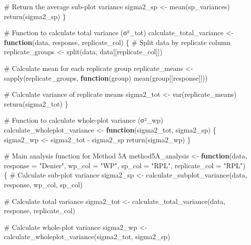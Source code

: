 \documentclass[
  letterpaper,
  DIV=11,
  numbers=noendperiod]{scrartcl}
\newenvironment{Shaded}{\begin{snugshade}}{\end{snugshade}}
\newcommand{\AttributeTok}[1]{\textcolor[rgb]{0.40,0.45,0.13}{#1}}
\newcommand{\CommentTok}[1]{\textcolor[rgb]{0.37,0.37,0.37}{#1}}
\newcommand{\ControlFlowTok}[1]{\textcolor[rgb]{0.00,0.23,0.31}{\textbf{#1}}}
\newcommand{\FunctionTok}[1]{\textcolor[rgb]{0.28,0.35,0.67}{#1}}
\newcommand{\NormalTok}[1]{\textcolor[rgb]{0.00,0.23,0.31}{#1}}
\newcommand{\OtherTok}[1]{\textcolor[rgb]{0.00,0.23,0.31}{#1}}
\newcommand{\SpecialCharTok}[1]{\textcolor[rgb]{0.37,0.37,0.37}{#1}}
\newcommand{\StringTok}[1]{\textcolor[rgb]{0.13,0.47,0.30}{#1}}
\begin{document}
\begin{Shaded}
\begin{Highlighting}[]
  \CommentTok{\# Return the average sub{-}plot variance}
\NormalTok{  sigma2\_sp }\OtherTok{\textless{}{-}} \FunctionTok{mean}\NormalTok{(sp\_variances)}
  \FunctionTok{return}\NormalTok{(sigma2\_sp)}
\NormalTok{\}}

\CommentTok{\# Function to calculate total variance (σ²\_tot)}
\NormalTok{calculate\_total\_variance }\OtherTok{\textless{}{-}} \ControlFlowTok{function}\NormalTok{(data, response, replicate\_col) \{}
  \CommentTok{\# Split data by replicate column}
\NormalTok{  replicate\_groups }\OtherTok{\textless{}{-}} \FunctionTok{split}\NormalTok{(data, data[[replicate\_col]])}
  
  \CommentTok{\# Calculate mean for each replicate group}
\NormalTok{  replicate\_means }\OtherTok{\textless{}{-}} \FunctionTok{sapply}\NormalTok{(replicate\_groups, }\ControlFlowTok{function}\NormalTok{(group) }\FunctionTok{mean}\NormalTok{(group[[response]]))}
  
  \CommentTok{\# Calculate variance of replicate means}
\NormalTok{  sigma2\_tot }\OtherTok{\textless{}{-}} \FunctionTok{var}\NormalTok{(replicate\_means)}
  \FunctionTok{return}\NormalTok{(sigma2\_tot)}
\NormalTok{\}}

\CommentTok{\# Function to calculate whole{-}plot variance (σ²\_wp)}
\NormalTok{calculate\_wholeplot\_variance }\OtherTok{\textless{}{-}} \ControlFlowTok{function}\NormalTok{(sigma2\_tot, sigma2\_sp) \{}
\NormalTok{  sigma2\_wp }\OtherTok{\textless{}{-}}\NormalTok{ sigma2\_tot }\SpecialCharTok{{-}}\NormalTok{ sigma2\_sp}
  \FunctionTok{return}\NormalTok{(sigma2\_wp)}
\NormalTok{\}}

\CommentTok{\# Main analysis function for Method 5A}
\NormalTok{method5A\_analysis }\OtherTok{\textless{}{-}} \ControlFlowTok{function}\NormalTok{(data, }\AttributeTok{response =} \StringTok{"Denier"}\NormalTok{, }\AttributeTok{wp\_col =} \StringTok{"WP"}\NormalTok{, }\AttributeTok{sp\_col =} \StringTok{"RPL"}\NormalTok{, }\AttributeTok{replicate\_col =} \StringTok{"RPL"}\NormalTok{) \{}
  \CommentTok{\# Calculate sub{-}plot variance}
\NormalTok{  sigma2\_sp }\OtherTok{\textless{}{-}} \FunctionTok{calculate\_subplot\_variance}\NormalTok{(data, response, wp\_col, sp\_col)}
  
  \CommentTok{\# Calculate total variance}
\NormalTok{  sigma2\_tot }\OtherTok{\textless{}{-}} \FunctionTok{calculate\_total\_variance}\NormalTok{(data, response, replicate\_col)}
  
  \CommentTok{\# Calculate whole{-}plot variance}
\NormalTok{  sigma2\_wp }\OtherTok{\textless{}{-}} \FunctionTok{calculate\_wholeplot\_variance}\NormalTok{(sigma2\_tot, sigma2\_sp)}
  

\end{Highlighting}
\end{Shaded}
\end{document}
